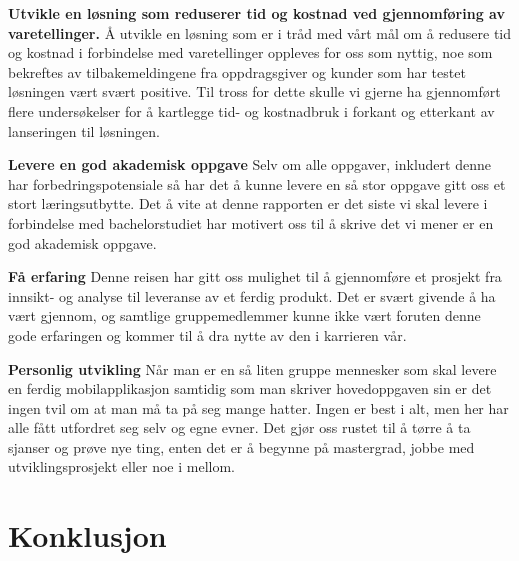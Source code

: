 \begin{description}
    \item{\textbf{Utvikle en løsning som reduserer tid og kostnad ved gjennomføring av varetellinger. }}
    Å utvikle en løsning som er i tråd med vårt mål om å redusere tid og kostnad i forbindelse med varetellinger oppleves for oss som nyttig, noe som bekreftes av tilbakemeldingene fra oppdragsgiver og kunder som har testet løsningen vært svært positive. Til tross for dette skulle vi gjerne ha gjennomført flere undersøkelser for å kartlegge tid- og kostnadbruk i forkant og etterkant av lanseringen til løsningen.
    
    \item{\textbf{Levere en god akademisk oppgave}}
    Selv om alle oppgaver, inkludert denne har forbedringspotensiale så har det å kunne levere en så stor oppgave gitt oss et stort læringsutbytte. Det å vite at denne rapporten er det siste vi skal levere i forbindelse med bachelorstudiet har motivert oss til å skrive det vi mener er en god akademisk oppgave. 
       
    \item{\textbf{Få erfaring}}
    Denne reisen har gitt oss mulighet til å gjennomføre et prosjekt fra innsikt- og analyse til leveranse av et ferdig produkt. Det er svært givende å ha vært gjennom, og samtlige gruppemedlemmer kunne ikke vært foruten denne gode erfaringen og kommer til å dra nytte av den i karrieren vår.
    
    \item{\textbf{Personlig utvikling}}
    Når man er en så liten gruppe mennesker som skal levere en ferdig mobilapplikasjon samtidig som man skriver hovedoppgaven sin er det ingen tvil om at man må ta på seg mange hatter. Ingen er best i alt, men her har alle fått utfordret seg selv og egne evner. Det gjør oss rustet til å tørre å ta sjanser og prøve nye ting, enten det er å begynne på mastergrad, jobbe med utviklingsprosjekt eller noe i mellom. 
    
\end{description}

\section{\textbf{Konklusjon}}


